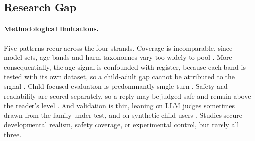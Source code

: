 \subsection{Research Gap}
\label{sec:gap}
\label{sec:rw_limitations}
\label{sec:rw_synthesis}
\label{sec:rw_design}
\label{sec:rw_questions}

\paragraph{Methodological limitations.} Five patterns recur across the four
strands. Coverage is incomparable, since model sets, age bands and harm
taxonomies vary too widely to pool \cite{muraliEvaluatingLLMSafety2026,
caoSafeDialBenchFineGrainedSafety2026, khooMinorBenchHandbuiltBenchmark2025,
yuYouthCenteredGenAIRisks2025}. More consequentially, the age signal is
confounded with register, because each band is tested with its own dataset, so a
child-adult gap cannot be attributed to the signal
\cite{jiaoSafeChildLLMDevelopmentalBenchmark2025, muraliEvaluatingLLMSafety2026,
xingSproutBenchBenchmarkSafe2025}. Child-focused evaluation is predominantly
single-turn \cite{jiaoSafeChildLLMDevelopmentalBenchmark2025,
khooMinorBenchHandbuiltBenchmark2025, ozcanEvaluatingChildAppropriateLanguage2026}.
Safety and readability are scored separately, so a reply may be judged safe and
remain above the reader's level \cite{ozcanEvaluatingChildAppropriateLanguage2026}.
And validation is thin, leaning on LLM judges sometimes drawn from the family
under test, and on synthetic child users
\cite{liStateDependentSafetyFailures2026, luoChildEvalWhenLarge2026,
vidgenSimpleSafetyTestsTestSuite2024a, cathryn_iImprovingTeenSafety2025,
kurianNoAlexaNo2025}. Studies secure developmental realism, safety coverage, or
experimental control, but rarely all three.

